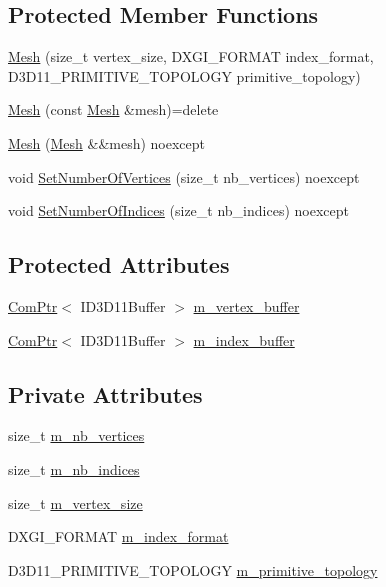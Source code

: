 \subsection*{Protected Member Functions}
\begin{DoxyCompactItemize}
\item 
\hyperlink{classmage_1_1_mesh_a1e61f6254fab6af510d40c437bc2922b}{Mesh} (size\+\_\+t vertex\+\_\+size, D\+X\+G\+I\+\_\+\+F\+O\+R\+M\+AT index\+\_\+format, D3\+D11\+\_\+\+P\+R\+I\+M\+I\+T\+I\+V\+E\+\_\+\+T\+O\+P\+O\+L\+O\+GY primitive\+\_\+topology)
\item 
\hyperlink{classmage_1_1_mesh_a1627e85c72d10bdedbfbf746b108cc73}{Mesh} (const \hyperlink{classmage_1_1_mesh}{Mesh} \&mesh)=delete
\item 
\hyperlink{classmage_1_1_mesh_aaa8f270d59a8fc629cd695c75c9ff7c7}{Mesh} (\hyperlink{classmage_1_1_mesh}{Mesh} \&\&mesh) noexcept
\item 
void \hyperlink{classmage_1_1_mesh_abdb9050ecea85108b1e890a68aa5b656}{Set\+Number\+Of\+Vertices} (size\+\_\+t nb\+\_\+vertices) noexcept
\item 
void \hyperlink{classmage_1_1_mesh_a87ddba20dbdc57b168d38b02e7ccfdd0}{Set\+Number\+Of\+Indices} (size\+\_\+t nb\+\_\+indices) noexcept
\end{DoxyCompactItemize}
\subsection*{Protected Attributes}
\begin{DoxyCompactItemize}
\item 
\hyperlink{namespacemage_ae74f374780900893caa5555d1031fd79}{Com\+Ptr}$<$ I\+D3\+D11\+Buffer $>$ \hyperlink{classmage_1_1_mesh_af5ae74887eb330201829477cf772ba6e}{m\+\_\+vertex\+\_\+buffer}
\item 
\hyperlink{namespacemage_ae74f374780900893caa5555d1031fd79}{Com\+Ptr}$<$ I\+D3\+D11\+Buffer $>$ \hyperlink{classmage_1_1_mesh_abe29363ebac77b284ca69532fd5b3373}{m\+\_\+index\+\_\+buffer}
\end{DoxyCompactItemize}
\subsection*{Private Attributes}
\begin{DoxyCompactItemize}
\item 
size\+\_\+t \hyperlink{classmage_1_1_mesh_a5a04aa73e98c75dd5b8929296c3af9bb}{m\+\_\+nb\+\_\+vertices}
\item 
size\+\_\+t \hyperlink{classmage_1_1_mesh_a5e3baa9e2b2e9b4ce795a456f76d87b2}{m\+\_\+nb\+\_\+indices}
\item 
size\+\_\+t \hyperlink{classmage_1_1_mesh_a94a983af3aad7327aab525d6b40f90a7}{m\+\_\+vertex\+\_\+size}
\item 
D\+X\+G\+I\+\_\+\+F\+O\+R\+M\+AT \hyperlink{classmage_1_1_mesh_acb99aac5dee4bb0553a20df4233a5b34}{m\+\_\+index\+\_\+format}
\item 
D3\+D11\+\_\+\+P\+R\+I\+M\+I\+T\+I\+V\+E\+\_\+\+T\+O\+P\+O\+L\+O\+GY \hyperlink{classmage_1_1_mesh_a8757a0616fe72d0475ace99efc67350b}{m\+\_\+primitive\+\_\+topology}
\end{DoxyCompactItemize}


